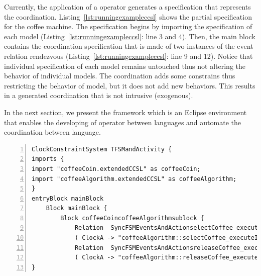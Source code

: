Currently, the application of a \bcool operator generates a \ccsl specification that represents the coordination. Listing~\ref{lst:runningexampleccsl} shows the partial \ccsl specification for the coffee machine. The specification begins by importing the \ccsl specification of each model (Listing~\ref{lst:runningexampleccsl}: line 3 and 4). Then, the main block contains the coordination specification that is made of two instances of the event relation rendezvous (Listing~\ref{lst:runningexampleccsl}: line 9 and 12). Notice that individual specification of each model remains untouched thus not altering the behavior of individual models. The coordination adds some constrains thus restricting the behavior of model, but it does not add new behaviors. This results in a generated coordination that is not intrusive (\ie exogenous).

In the next section, we present the \bcool framework which is an Eclipse environment that enables the developing of \bcool operator between languages and automate the coordination between language. 




\begin{lstlisting}[language=moccml,
caption={Resulting \ccsl specification for the running example},
label={lst:runningexampleccsl}, 
basicstyle=\scriptsize\ttfamily, backgroundcolor=\color{LGrey}, numbers=left, xleftmargin=2pt]
ClockConstraintSystem TFSMandActivity {
imports {
import "coffeeCoin.extendedCCSL" as coffeeCoin;
import "coffeeAlgorithm.extendedCCSL" as coffeeAlgorithm;
}
entryBlock mainBlock
	Block mainBlock {
		Block coffeeCoincoffeeAlgorithmsublock {
			Relation  SyncFSMEventsAndActionselectCoffee_executeItselectCoffee_occurs [ RendezVous ]
			( ClockA -> "coffeeAlgorithm::selectCoffee_executeIt", ClockB -> "coffeeCoin::selectCoffee_occurs")
			Relation  SyncFSMEventsAndActionsreleaseCoffee_executeItreleaseCoffee_occurs [ RendezVous ]
			( ClockA -> "coffeeAlgorithm::releaseCoffee_executeIt", ClockB -> "coffeeCoin::releaseCoffee_occurs")}}
}
\end{lstlisting}    